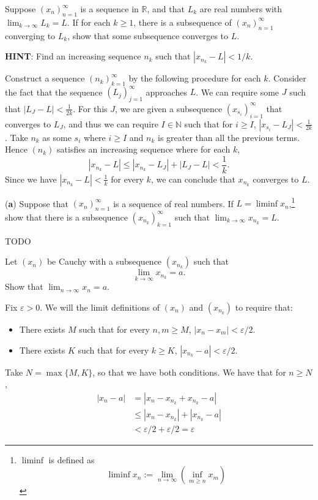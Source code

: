 \documentclass[../main.tex]{subfiles}
\begin{document}
\begin{problem}[\S2.7 I]
Suppose $(x_n)_{n = 1}^\infty$ is a sequence in $\mathbb{R}$, and that $L_k$ are real numbers with $\lim_{k \to \infty} L_k = L$.
If for each $k \ge 1$, there is a subsequence of $(x_n)_{n = 1}^\infty$ converging to $L_k$, show that some subsequence converges to $L$.

\textbf{HINT}: Find an increasing sequence $n_k$ such that $|x_{n_k} - L| < 1/k$.
\end{problem}
Construct a sequence $(n_k)_{k = 1}^\infty$ by the following procedure for each $k$.
Consider the fact that the sequence $(L_j)_{j = 1}^\infty$ approaches $L$.
We can require some $J$ such that $|L_{J} - L| < \frac{1}{2k}$.
For this $J$, we are given a subsequence $(x_{s_{i}})_{i = 1}^\infty$ that converges to $L_J$, and thus we can require $I \in \mathbb{N}$ such that for $i \ge I$, $|x_{s_i} - L_J| < \frac{1}{2k}$.
Take $n_k$ as some $s_i$ where $i \ge I$ and $n_k$ is greater than all the previous terms.
Hence $(n_k)$ satisfies an increasing sequence where for each $k$,
\[
	|x_{n_k} - L| \le |x_{n_k} - L_J| + |L_J - L| < \frac{1}{k}.
\]
Since we have $|x_{n_k} - L| < \frac{1}{k}$ for every $k$, we can conclude that $x_{n_k}$ converges to $L$.

\begin{problem}[\S2.7 J]
(\textbf{a}) Suppose that $(x_n)_{n = 1}^\infty$ is a sequence of real numbers.
If $L = \liminf x_n$,\footnote{$\liminf$ is defined as
	\[ \liminf x_n := \lim_{n \to \infty} \left(\inf_{m \ge n} x_m\right) \]}
show that there is a subsequence $(x_{n_k})_{k = 1}^\infty$ such that $\lim_{k \to \infty} x_{n_k} = L$.
\end{problem}
{\huge TODO}

\begin{problem}[\S2.8 A]
Let $(x_n)$ be Cauchy with a subsequence $(x_{n_k})$ such that
\[
	\lim_{k \to \infty} x_{n_k} = a.
\]
Show that $\lim_{n \to \infty} x_n = a$.
\end{problem}
Fix $\varepsilon > 0$.
We will the limit definitions of $(x_n)$ and $(x_{n_k})$ to require that:
\begin{itemize}
	\item There exists $M$ such that for every $n, m \ge M$, $|x_n - x_m| < \varepsilon/2$.
	\item There exists $K$ such that for every $k \ge K$, $|x_{n_k} - a| < \varepsilon/2$.
\end{itemize}
Take $N = \max\{ M, K \}$, so that we have both conditions.
We have that for $n \ge N$,
\begin{align*}
	|x_n - a|
	 & = |x_n - x_{n_k} + x_{n_k} - a|               \\
	 & \le |x_n - x_{n_k}| + |x_{n_k} - a|           \\
	 & < \varepsilon/2 + \varepsilon/2 = \varepsilon
\end{align*}
\end{document}
